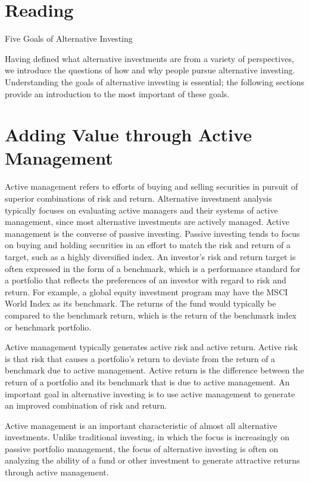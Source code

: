\documentclass[11pt]{article}
\begin{document}
\section*{Reading}
Five Goals of Alternative Investing

Having defined what alternative investments are from a variety of perspectives, we introduce the questions of how and why people pursue alternative investing. Understanding the goals of alternative investing is essential; the following sections provide an introduction to the most important of these goals.

\section*{Adding Value through Active Management}
Active management refers to efforts of buying and selling securities in pursuit of superior combinations of risk and return. Alternative investment analysis typically focuses on evaluating active managers and their systems of active management, since most alternative investments are actively managed. Active management is the converse of passive investing. Passive investing tends to focus on buying and holding securities in an effort to match the risk and return of a target, such as a highly diversified index. An investor's risk and return target is often expressed in the form of a benchmark, which is a performance standard for a portfolio that reflects the preferences of an investor with regard to risk and return. For example, a global equity investment program may have the MSCI World Index as its benchmark. The returns of the fund would typically be compared to the benchmark return, which is the return of the benchmark index or benchmark portfolio.

Active management typically generates active risk and active return. Active risk is that risk that causes a portfolio's return to deviate from the return of a benchmark due to active management. Active return is the difference between the return of a portfolio and its benchmark that is due to active management. An important goal in alternative investing is to use active management to generate an improved combination of risk and return.

Active management is an important characteristic of almost all alternative investments. Unlike traditional investing, in which the focus is increasingly on passive portfolio management, the focus of alternative investing is often on analyzing the ability of a fund or other investment to generate attractive returns through active management.
\end{document}
